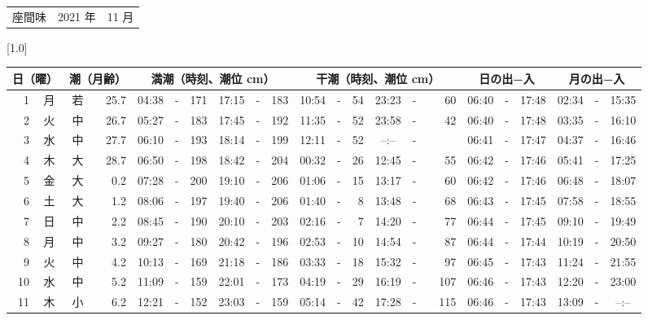 \documentclass[12pt,a4j]{jsarticle}
\begin{document}
 \begin{table}[htbp]
 \begin{center}
 \begin{tabular}{lcc}
 \LARGE{座間味}  & \large{2021 年} & \large{11 月} \\
 \end{tabular}
 \end{center}
 \begin{center}
    \scalebox{0.7}[1.0]{
    \begin{tabular}{|rc|cr|ccrccr|ccrccr|ccc|ccc|}
    \hline
    \multicolumn{2}{|c|}{日（曜）} & \multicolumn{2}{c|}{潮（月齢）} & \multicolumn{6}{c|}{満潮（時刻、潮位 cm）} & \multicolumn{6}{c|}{干潮（時刻、潮位 cm）} & \multicolumn{3}{c|}{日の出−入} &  \multicolumn{3}{c|}{月の出−入}\\
 \hline
 1 & 月 & 若 & 25.7 &  04:38 &-& 171 &  17:15 &-& 183 &  10:54 &-&  54 &  23:23 &-&  60 & 06:40 & -& 17:48 & 02:34 & -& 15:35 \\
 2 & 火 & 中 & 26.7 &  05:27 &-& 183 &  17:45 &-& 192 &  11:35 &-&  52 &  23:58 &-&  42 & 06:40 & -& 17:48 & 03:35 & -& 16:10 \\
 3 & 水 & 中 & 27.7 &  06:10 &-& 193 &  18:14 &-& 199 &  12:11 &-&  52 &  --:-- &-&~~~~~ & 06:41 & -& 17:47 & 04:37 & -& 16:46 \\
 4 & 木 & 大 & 28.7 &  06:50 &-& 198 &  18:42 &-& 204 &  00:32 &-&  26 &  12:45 &-&  55 & 06:42 & -& 17:46 & 05:41 & -& 17:25 \\
 5 & 金 & 大 &  0.2 &  07:28 &-& 200 &  19:10 &-& 206 &  01:06 &-&  15 &  13:17 &-&  60 & 06:42 & -& 17:46 & 06:48 & -& 18:07 \\
 6 & 土 & 大 &  1.2 &  08:06 &-& 197 &  19:40 &-& 206 &  01:40 &-&   8 &  13:48 &-&  68 & 06:43 & -& 17:45 & 07:58 & -& 18:55 \\
 7 & 日 & 中 &  2.2 &  08:45 &-& 190 &  20:10 &-& 203 &  02:16 &-&   7 &  14:20 &-&  77 & 06:44 & -& 17:45 & 09:10 & -& 19:49 \\
 8 & 月 & 中 &  3.2 &  09:27 &-& 180 &  20:42 &-& 196 &  02:53 &-&  10 &  14:54 &-&  87 & 06:44 & -& 17:44 & 10:19 & -& 20:50 \\
 9 & 火 & 中 &  4.2 &  10:13 &-& 169 &  21:18 &-& 186 &  03:33 &-&  18 &  15:32 &-&  97 & 06:45 & -& 17:43 & 11:24 & -& 21:55 \\
10 & 水 & 中 &  5.2 &  11:09 &-& 159 &  22:01 &-& 173 &  04:19 &-&  29 &  16:19 &-& 107 & 06:46 & -& 17:43 & 12:20 & -& 23:00 \\
11 & 木 & 小 &  6.2 &  12:21 &-& 152 &  23:03 &-& 159 &  05:14 &-&  42 &  17:28 &-& 115 & 06:46 & -& 17:43 & 13:09 & -& --:-- \\

\end{tabular}}
\end{center}
\end{table}
\end{document}
